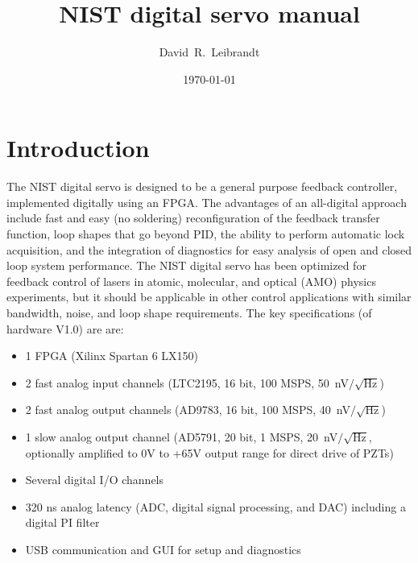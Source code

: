 \documentclass[aip,rsi,preprint,graphicx]{revtex4-1}
\begin{document}
\title{NIST digital servo manual}

\author{David~R.~Leibrandt}

\date{\today}

\maketitle

\tableofcontents

\section{Introduction}

The NIST digital servo is designed to be a general purpose feedback controller, implemented digitally using an FPGA.  The advantages of an all-digital approach include fast and easy (no soldering) reconfiguration of the feedback transfer function, loop shapes that go beyond PID, the ability to perform automatic lock acquisition, and the integration of diagnostics for easy analysis of open and closed loop system performance.  The NIST digital servo has been optimized for feedback control of lasers in atomic, molecular, and optical (AMO) physics experiments, but it should be applicable in other control applications with similar bandwidth, noise, and loop shape requirements.  The key specifications (of hardware V1.0) are are:
\begin{itemize}
\item 1 FPGA (Xilinx Spartan 6 LX150)
\item 2 fast analog input channels (LTC2195, 16 bit, 100 MSPS, 50~nV$/\sqrt{\textrm{Hz}}$)
\item 2 fast analog output channels (AD9783, 16 bit, 100 MSPS, 40~nV$/\sqrt{\textrm{Hz}}$)
\item 1 slow analog output channel (AD5791, 20 bit, 1 MSPS, 20~nV$/\sqrt{\textrm{Hz}}$, optionally amplified to 0V to +65V output range for direct drive of PZTs)
\item Several digital I/O channels
\item 320 ns analog latency (ADC, digital signal processing, and DAC) including a digital PI filter
\item USB communication and GUI for setup and diagnostics
\end{itemize}
\end{document}
